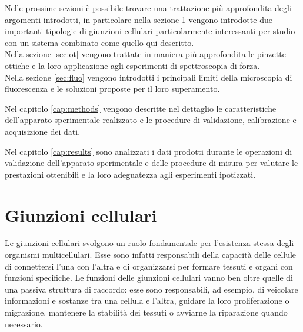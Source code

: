 Nelle prossime sezioni è possibile trovare una trattazione più
approfondita degli argomenti introdotti, in particolare nella sezione
\ref{sec:giunzioni} vengono introdotte due importanti tipologie di
giunzioni cellulari particolarmente interessanti per studio con un
sistema combinato come quello qui descritto.\\
Nella sezione \ref{sec:ot} vengono trattate in maniera più
approfondita le pinzette ottiche e la loro applicazione agli
esperimenti di spettroscopia di forza.\\
Nella sezione \ref{sec:fluo} vengono introdotti i principali limiti
della microscopia di fluorescenza e le soluzioni proposte per il loro
superamento.

Nel capitolo \ref{cap:methods} vengono descritte nel dettaglio le
caratteristiche dell'apparato sperimentale realizzato e le procedure
di validazione, calibrazione e acquisizione dei dati.

Nel capitolo \ref{cap:results} sono analizzati i dati prodotti durante
le operazioni di validazione dell'apparato sperimentale e delle
procedure di misura per valutare le prestazioni ottenibili e la loro
adeguatezza agli esperimenti ipotizzati.









\section{Giunzioni cellulari}
\label{sec:giunzioni}

Le giunzioni cellulari svolgono un ruolo fondamentale per l'esistenza
stessa degli organismi multicellulari.
Esse sono infatti responsabili della capacità delle cellule di
connettersi l'una con l'altra e di organizzarsi per formare tessuti e
organi con funzioni specifiche.
Le funzioni delle giunzioni cellulari vanno ben oltre quelle di una
passiva struttura di raccordo: esse sono responsabili, ad esempio,
di veicolare informazioni e sostanze tra una cellula e l'altra,
guidare la loro proliferazione o migrazione, mantenere la stabilità
dei tessuti o avviarne la riparazione quando necessario.

